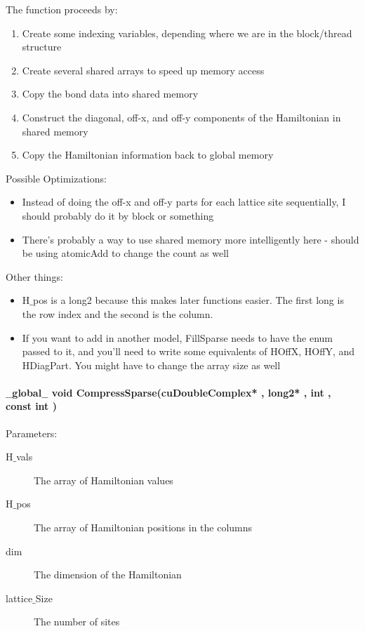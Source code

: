\documentclass{article}
\begin{document}
The function proceeds by:
\begin{enumerate}
\item{Create some indexing variables, depending where we are in the block/thread structure}
\item{Create several shared arrays to speed up memory access}
\item{Copy the bond data into shared memory}
\item{Construct the diagonal, off-x, and off-y components of the Hamiltonian in shared memory}
\item{Copy the Hamiltonian information back to global memory}
\end{enumerate}

Possible Optimizations:
\begin{itemize}
\item{Instead of doing the off-x and off-y parts for each lattice site sequentially, I should probably do it by block or something}
\item{There's probably a way to use shared memory more intelligently here - should be using atomicAdd to change the count as well}
\end{itemize}

Other things:
\begin{itemize}
\item{H$\_$pos is a long2 because this makes later functions easier. The first long is the row index and the second is the column.}
\item{If you want to add in another model, FillSparse needs to have the enum passed to it, and you'll need to write some equivalents of HOffX, HOffY, and HDiagPart. You might have to change the array size as well}
\end{itemize}

\paragraph{ $\_\_$global$\_\_$ void CompressSparse(cuDoubleComplex* , long2* , int , const int )}

Parameters:
\begin{description}
\item[H$\_$vals] The array of Hamiltonian values
\item[H$\_$pos] The array of Hamiltonian positions in the columns
\item[dim] The dimension of the Hamiltonian
\item[lattice$\_$Size] The number of sites
\end{description}
\end{document}
